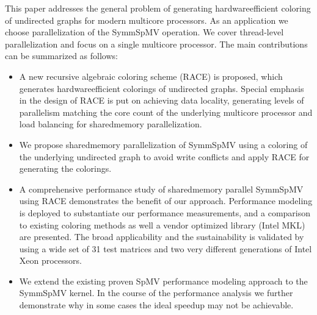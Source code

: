 

This paper addresses the general problem of generating hardware\rAdd{-}efficient \DK coloring
 of undirected graphs for modern multicore processors. As an application we 
 choose parallelization of the \acrshort{SymmSpMV} operation. We cover thread-level 
 parallelization and focus on a single multicore processor. The main contributions
  can be summarized as follows: 
\begin{itemize}
\item A new recursive algebraic coloring scheme (RACE) is proposed, 
which generates hardware\rAdd{-}efficient \DK colorings of undirected graphs. 
Special emphasis in the design of RACE is put on achieving data locality, 
generating levels of parallelism matching the core count of the underlying 
multicore processor and load balancing for shared\rAdd{-}memory parallelization.
\item We propose shared\rAdd{-}memory parallelization of \acrshort{SymmSpMV}  
using a \DTWO coloring of the underlying undirected graph to avoid
 write conflicts and apply RACE for generating the colorings.
\item A comprehensive performance study of shared\rAdd{-}memory parallel \acrshort{SymmSpMV} 
using RACE demonstrates the benefit of our approach. Performance modeling
 is deployed to substantiate our performance measurements, and a comparison to
  existing coloring methods as well a vendor optimized library (Intel MKL) 
  are presented. The broad applicability and the sustainability is validated 
  by using a wide set of 31 test matrices and two very different generations 
  of Intel Xeon processors.
\item We extend the existing proven \acrshort{SpMV} performance modeling approach
 to the \acrshort{SymmSpMV} kernel. 
In the course of the 
 performance analysis we further demonstrate why in some cases the ideal speedup
 may not be achievable.

\end{itemize}
